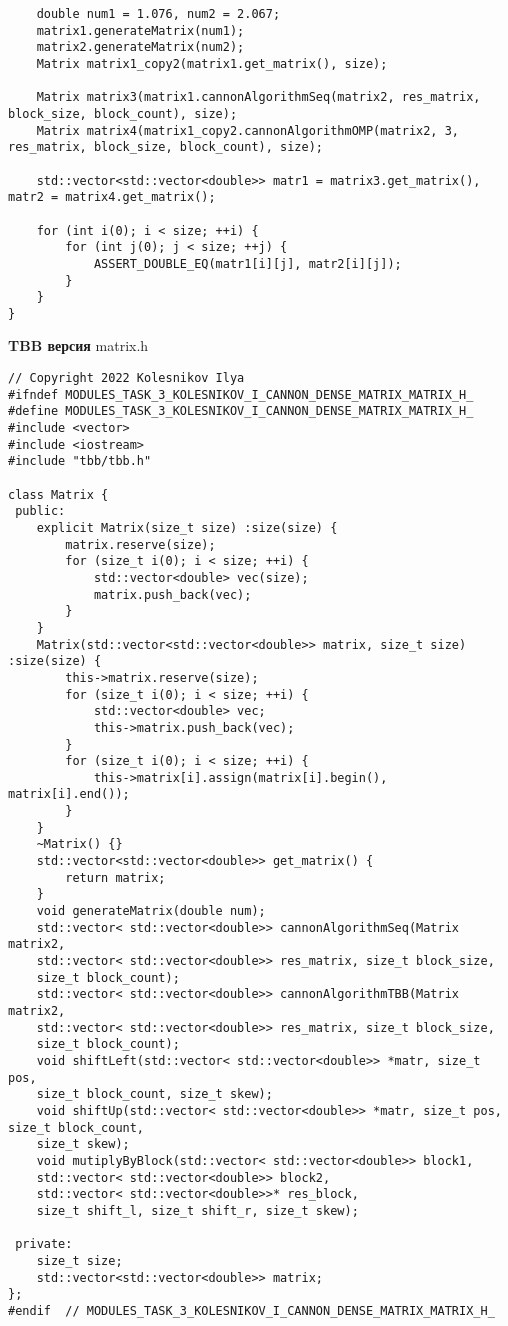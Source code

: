 \documentclass{report}
\begin{document}
\begin{lstlisting}
    double num1 = 1.076, num2 = 2.067;
    matrix1.generateMatrix(num1);
    matrix2.generateMatrix(num2);
    Matrix matrix1_copy2(matrix1.get_matrix(), size);

    Matrix matrix3(matrix1.cannonAlgorithmSeq(matrix2, res_matrix, block_size, block_count), size);
    Matrix matrix4(matrix1_copy2.cannonAlgorithmOMP(matrix2, 3, res_matrix, block_size, block_count), size);

    std::vector<std::vector<double>> matr1 = matrix3.get_matrix(), matr2 = matrix4.get_matrix();

    for (int i(0); i < size; ++i) {
        for (int j(0); j < size; ++j) {
            ASSERT_DOUBLE_EQ(matr1[i][j], matr2[i][j]);
        }
    }
}
\end{lstlisting}

\textbf{TBB версия}
\newline
\newline matrix.h
\begin{lstlisting}
// Copyright 2022 Kolesnikov Ilya
#ifndef MODULES_TASK_3_KOLESNIKOV_I_CANNON_DENSE_MATRIX_MATRIX_H_
#define MODULES_TASK_3_KOLESNIKOV_I_CANNON_DENSE_MATRIX_MATRIX_H_
#include <vector>
#include <iostream>
#include "tbb/tbb.h"

class Matrix {
 public:
    explicit Matrix(size_t size) :size(size) {
        matrix.reserve(size);
        for (size_t i(0); i < size; ++i) {
            std::vector<double> vec(size);
            matrix.push_back(vec);
        }
    }
    Matrix(std::vector<std::vector<double>> matrix, size_t size) :size(size) {
        this->matrix.reserve(size);
        for (size_t i(0); i < size; ++i) {
            std::vector<double> vec;
            this->matrix.push_back(vec);
        }
        for (size_t i(0); i < size; ++i) {
            this->matrix[i].assign(matrix[i].begin(), matrix[i].end());
        }
    }
    ~Matrix() {}
    std::vector<std::vector<double>> get_matrix() {
        return matrix;
    }
    void generateMatrix(double num);
    std::vector< std::vector<double>> cannonAlgorithmSeq(Matrix matrix2,
    std::vector< std::vector<double>> res_matrix, size_t block_size,
    size_t block_count);
    std::vector< std::vector<double>> cannonAlgorithmTBB(Matrix matrix2,
    std::vector< std::vector<double>> res_matrix, size_t block_size,
    size_t block_count);
    void shiftLeft(std::vector< std::vector<double>> *matr, size_t pos,
    size_t block_count, size_t skew);
    void shiftUp(std::vector< std::vector<double>> *matr, size_t pos, size_t block_count,
    size_t skew);
    void mutiplyByBlock(std::vector< std::vector<double>> block1,
    std::vector< std::vector<double>> block2,
    std::vector< std::vector<double>>* res_block,
    size_t shift_l, size_t shift_r, size_t skew);

 private:
    size_t size;
    std::vector<std::vector<double>> matrix;
};
#endif  // MODULES_TASK_3_KOLESNIKOV_I_CANNON_DENSE_MATRIX_MATRIX_H_
\end{lstlisting}
\end{document}
